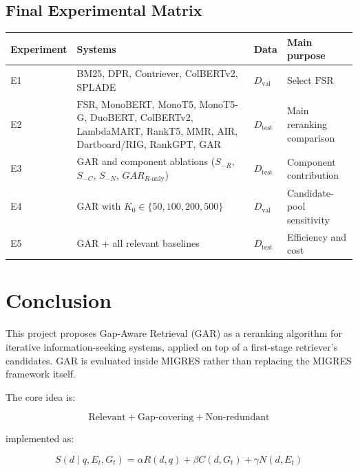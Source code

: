 \documentclass[11pt,a4paper]{article}
\begin{document}
\subsection{Final Experimental Matrix}
\label{sec:matrix}

\begin{center}
\small
\begin{tabularx}{\textwidth}{>{\raggedright\arraybackslash}p{2.0cm}>{\raggedright\arraybackslash}X>{\raggedright\arraybackslash}p{1.6cm}>{\raggedright\arraybackslash}p{2.9cm}}
\toprule
\textbf{Experiment} & \textbf{Systems} & \textbf{Data} & \textbf{Main purpose}\\
\midrule
E1 & BM25, DPR, Contriever, ColBERTv2, SPLADE & $D_{\mathrm{val}}$ & Select $\mathrm{FSR}$\\
E2 & $\mathrm{FSR}$, MonoBERT, MonoT5, MonoT5-G, DuoBERT, ColBERTv2, LambdaMART, RankT5, MMR, AIR, Dartboard/RIG, RankGPT, GAR & $D_{\mathrm{test}}$ & Main reranking comparison\\
E3 & GAR and component ablations ($S_{-R}$, $S_{-C}$, $S_{-N}$, $GAR_{R\text{-only}}$) & $D_{\mathrm{test}}$ & Component contribution\\
E4 & GAR with $K_0\in\{50,100,200,500\}$ & $D_{\mathrm{val}}$ & Candidate-pool sensitivity\\
E5 & GAR + all relevant baselines & $D_{\mathrm{test}}$ & Efficiency and cost\\
\bottomrule
\end{tabularx}
\end{center}

\section{Conclusion}

This project proposes Gap-Aware Retrieval (GAR) as a reranking algorithm for iterative information-seeking systems, applied on top of a first-stage retriever's candidates. GAR is evaluated inside MIGRES rather than replacing the MIGRES framework itself.

The core idea is:

\[
\boxed{
\text{Relevant}
+
\text{Gap-covering}
+
\text{Non-redundant}
}
\]

implemented as:

\[
\boxed{
S(d\mid q,E_t,G_t)
=
\alpha R(d,q)
+
\beta C(d,G_t)
+
\gamma N(d,E_t)
}
\]
\end{document}

